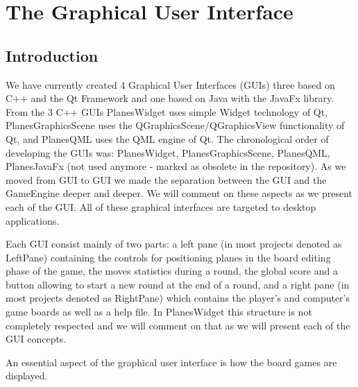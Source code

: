 \documentclass{report}
\begin{document}







\chapter {The Graphical User Interface}

\section{Introduction}

We have currently created 4 Graphical User Interfaces (GUIs) three based on C++ and the Qt Framework and one based on Java with the JavaFx library. From the 3 C++ GUIs PlanesWidget uses simple Widget technology of Qt, PlanesGraphicsScene uses the QGraphicsScene/QGraphicsView functionality of Qt, and PlanesQML uses the QML engine of Qt. The chronological order of developing the GUIs was: PlanesWidget, PlanesGraphicsScene, PlanesQML, PlanesJavaFx (not used anymore - marked as obsolete in the repository). As we moved from GUI to GUI we made the separation between the GUI and the GameEngine deeper and deeper. We will comment on these aspects as we present each of the GUI. All of these graphical interfaces are targeted to desktop applications.

Each GUI consist mainly of two parts: a left pane (in most projects denoted as LeftPane) containing the controls for positioning planes in the board editing phase of the game, the moves statistics during a round, the global score and a button allowing to start a new round at the end of a round, and a right pane (in most projects denoted as RightPane) which contains the player's and computer's game boards as well as a help file. In PlanesWidget this structure is not completely respected and we will comment on that as we will present each of the GUI concepts.

An essential aspect of the graphical user interface is how the board games are displayed. 






\begin{appendices}
	
\end{appendices}



\end{document}
